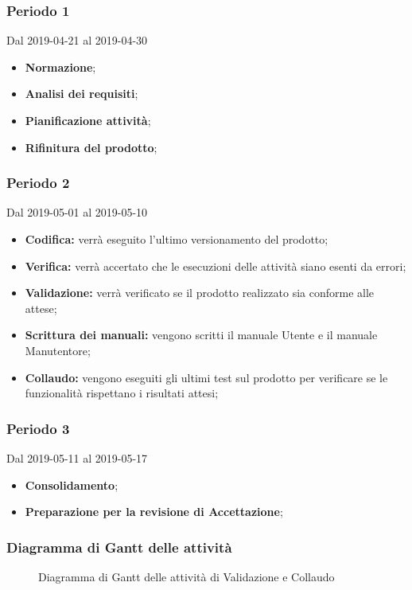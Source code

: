 \subsubsection{Periodo 1} 
Dal 2019-04-21 al 2019-04-30
\begin{itemize}
	\item \textbf{Normazione};
	\item \textbf{Analisi dei requisiti};
	\item \textbf{Pianificazione attività};
	\item \textbf{Rifinitura del prodotto};
\end{itemize}
\subsubsection{Periodo 2} 
Dal 2019-05-01 al 2019-05-10
\begin{itemize}
	\item \textbf{Codifica:} verrà eseguito l'ultimo versionamento del prodotto;
	\item \textbf{Verifica:} verrà accertato che le esecuzioni delle attività siano esenti da errori;
	\item \textbf{Validazione:} verrà verificato se il prodotto realizzato sia conforme alle attese;
	\item \textbf{Scrittura dei manuali:} vengono scritti il manuale Utente e il manuale Manutentore;
	\item \textbf{Collaudo:} vengono eseguiti gli ultimi test sul prodotto per verificare se le funzionalità rispettano i risultati attesi;
\end{itemize}
\subsubsection{Periodo 3} 
Dal 2019-05-11 al 2019-05-17
\begin{itemize}
	\item \textbf{Consolidamento};
	\item \textbf{Preparazione per la revisione di Accettazione};
\end{itemize}
\subsubsection{Diagramma di Gantt delle attività}
\begin{figure}[h]
	\caption{Diagramma di Gantt delle attività di Validazione e Collaudo}
\end{figure}

